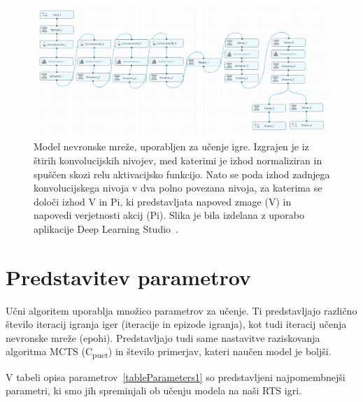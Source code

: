 \documentclass[a4paper, 12pt]{book}
\begin{document}
\begin{figure}[h]
	\begin{center}
		\includegraphics[width=1\textwidth]{photos/model_using_deepcognition.pdf}
	\end{center}
	\caption{Model nevronske mreže, uporabljen za učenje igre. Izgrajen je iz štirih konvolucijskih nivojev, med katerimi je izhod normaliziran in spuščen skozi relu aktivacijsko funkcijo. Nato se poda izhod zadnjega konvolucijskega nivoja v dva polno povezana nivoja, za katerima se določi izhod V in Pi, ki predstavljata napoved zmage (V) in napovedi verjetnosti akcij (Pi).
		Slika je bila izdelana z uporabo aplikacije Deep Learning Studio~\cite{deepcognition}.}
	\label{vizualzacijaModela}
\end{figure}



\section{Predstavitev parametrov}
\label{parametri}
Učni algoritem uporablja množico parametrov za učenje.
Ti predstavljajo različno število iteracij igranja iger (iteracije in epizode igranja), kot tudi iteracij učenja nevronske mreže (epohi).
Predstavljajo tudi same nastavitve raziskovanja algoritma MCTS (C\textsubscript{puct}) in število primerjav, kateri naučen model je boljši.

V tabeli opisa parametrov~\ref{tableParameters1} so predstavljeni najpomembnejši parametri, ki smo jih spreminjali ob učenju modela na naši RTS igri.
\end{document}
